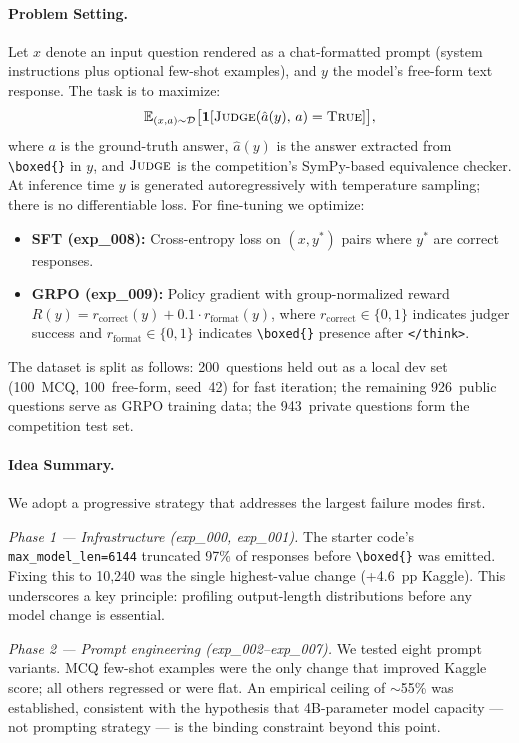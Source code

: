 \documentclass{article}
\begin{document}
\paragraph{Problem Setting.}
Let $x$ denote an input question rendered as a chat-formatted prompt (system instructions plus optional few-shot examples), and $y$ the model's free-form text response. The task is to maximize:
\[
  \mathbb{E}_{(x,a) \sim \mathcal{D}}\bigl[\mathbf{1}[\textsc{Judge}(\hat{a}(y),\, a) = \textsc{True}]\bigr],
\]
where $a$ is the ground-truth answer, $\hat{a}(y)$ is the answer extracted from \verb|\boxed{}| in $y$, and $\textsc{Judge}$ is the competition's SymPy-based equivalence checker. At inference time $y$ is generated autoregressively with temperature sampling; there is no differentiable loss. For fine-tuning we optimize:
\begin{itemize}
  \item \textbf{SFT (exp\_008):} Cross-entropy loss on $(x, y^{*})$ pairs where $y^{*}$ are correct responses.
  \item \textbf{GRPO (exp\_009):} Policy gradient with group-normalized reward $R(y) = r_{\text{correct}}(y) + 0.1\cdot r_{\text{format}}(y)$, where $r_{\text{correct}} \in \{0, 1\}$ indicates judger success and $r_{\text{format}} \in \{0, 1\}$ indicates \verb|\boxed{}| presence after \verb|</think>|.
\end{itemize}

The dataset is split as follows: 200~questions held out as a local dev set (100~MCQ, 100~free-form, seed~42) for fast iteration; the remaining 926~public questions serve as GRPO training data; the 943~private questions form the competition test set.

\paragraph{Idea Summary.}
We adopt a progressive strategy that addresses the largest failure modes first.

\emph{Phase 1 --- Infrastructure (exp\_000, exp\_001).} The starter code's \texttt{max\_model\_len=6144} truncated 97\% of responses before \verb|\boxed{}| was emitted. Fixing this to 10,240 was the single highest-value change (+4.6~pp Kaggle). This underscores a key principle: profiling output-length distributions before any model change is essential.

\emph{Phase 2 --- Prompt engineering (exp\_002--exp\_007).} We tested eight prompt variants. MCQ few-shot examples were the only change that improved Kaggle score; all others regressed or were flat. An empirical ceiling of ${\sim}$55\% was established, consistent with the hypothesis that 4B-parameter model capacity --- not prompting strategy --- is the binding constraint beyond this point.
\end{document}
